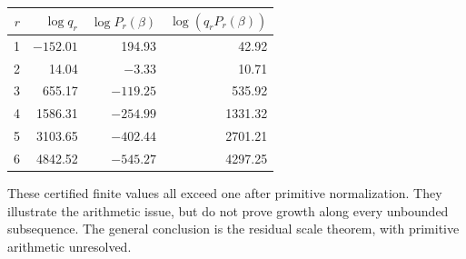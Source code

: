 \begin{center}
\begin{tabular}{rrrr}
\toprule
$r$&$\log q_r$&$\log P_r(\beta)$&$\log(q_rP_r(\beta))$\\
\midrule
1&$-152.01$&194.93&42.92\\
2&14.04&$-3.33$&10.71\\
3&655.17&$-119.25$&535.92\\
4&1586.31&$-254.99$&1331.32\\
5&3103.65&$-402.44$&2701.21\\
6&4842.52&$-545.27$&4297.25\\
\bottomrule
\end{tabular}
\end{center}
These certified finite values all exceed one after primitive
normalization. They illustrate the arithmetic issue, but do not prove
growth along every unbounded subsequence. The general conclusion is
the residual scale theorem, with primitive arithmetic unresolved.
